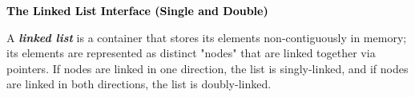 \documentclass[6.6pt, twocolumn]{extarticle}
\newcommand{\iteminfo}{\item[\textcolor{info}{\scalebox{1.0}{\faInfoCircle}}]}
\newcommand{\blueheader}[1]{\textcolor{black}{\fontsize{7.00pt}{1.0}\bfseries{#1}}\vspace{0.2ex} }
\newcommand{\vocab}[1]{\textcolor{vocabcolor}{\bfseries{\emph{#1}}}}
\newcommand\mystrut{\rule[-0.5pt]{0pt}{0.875em}} %
\newcommand{\code}[1]{\mbox{%
    \fontsize{5.75pt}{1.17}\ttfamily\mystrut
    \tcbox[
        on line,
        boxsep=0.1pt, left=1.0pt, right=1.0pt, top=0.75pt, bottom=0.75pt,
        toprule=0pt, rightrule=0pt, bottomrule=0pt, leftrule=0pt,
        oversize=0pt, enlarge left by=0pt, enlarge right by=0pt,
        colframe=black!16,colback=inlinecodeBG,arc=0.8pt,boxrule=0.4pt,fontupper={\ttfamily\mystrut}
    ]{#1}%
}%
}
\begin{document}
\blueheader{The Linked List Interface (Single and Double)}

A \vocab{linked list} is a container that stores its elements non-contiguously in memory; its elements are represented as distinct "nodes" that are linked together via pointers. If nodes are linked in one direction, the list is singly-linked, and if nodes are linked in both directions, the list is doubly-linked. 





\end{document}
